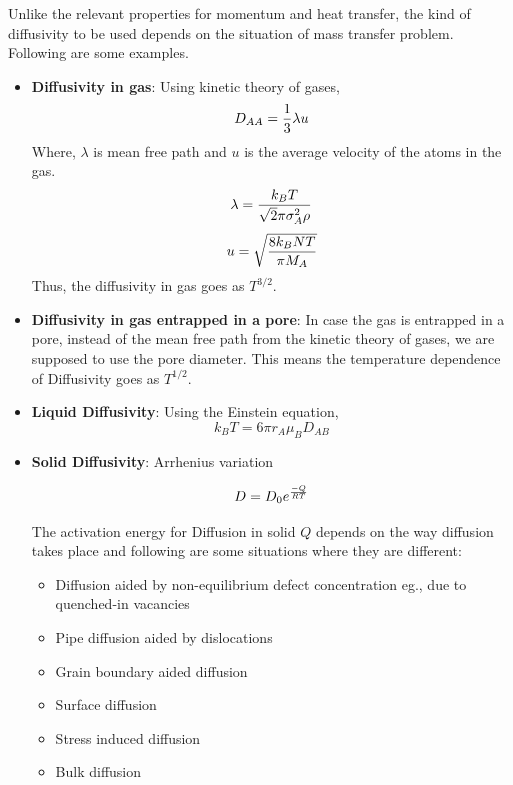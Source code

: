 Unlike the relevant properties for momentum and heat transfer, the kind of
diffusivity to be used depends on the situation of mass transfer problem.
Following are some examples.

\begin{itemize}
\item \textbf{Diffusivity in gas}: Using kinetic theory of gases,
$$D_{AA} = {1 \over 3} \lambda u$$
Where, $\lambda$ is mean free path and $u$ is the average velocity of the atoms
in the gas.
$$\lambda = {k_B T \over \sqrt{2} \pi \sigma_A^2 \rho}$$
$$ u = \sqrt{8 k_B N T \over \pi M_A}$$
Thus, the diffusivity in gas goes as $T^{3/2}$.

\item \textbf{Diffusivity in gas entrapped in a pore}: In case the gas is
entrapped in a pore, instead of the mean free path from the kinetic theory of
gases, we are supposed to use the pore diameter. This means the temperature
dependence of Diffusivity goes as $T^{1/2}$.

\item \textbf{Liquid Diffusivity}: Using the Einstein equation,
$$k_B T = 6 \pi r_A \mu_B D_{AB}$$

\item \textbf{Solid Diffusivity}: Arrhenius variation

$$ D  = D_0 e^{-Q \over RT} $$

The activation energy for Diffusion in solid $Q$ depends on the way diffusion
takes place and following are some situations where they are different:

\begin{itemize}
\item Diffusion aided by non-equilibrium defect concentration eg., due to
quenched-in vacancies
\item Pipe diffusion aided by dislocations
\item Grain boundary aided diffusion
\item Surface diffusion
\item Stress induced diffusion
\item Bulk diffusion
\end{itemize}

\end{itemize}



